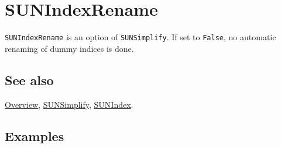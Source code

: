 \documentclass[../FeynCalcManual.tex]{subfiles}
\begin{document}
\hypertarget{sunindexrename}{%
\section{SUNIndexRename}\label{sunindexrename}}

\texttt{SUNIndexRename} is an option of \texttt{SUNSimplify}. If set to
\texttt{False}, no automatic renaming of dummy indices is done.

\subsection{See also}

\hyperlink{toc}{Overview}, \hyperlink{sunsimplify}{SUNSimplify},
\hyperlink{sunindex}{SUNIndex}.

\subsection{Examples}
\end{document}
